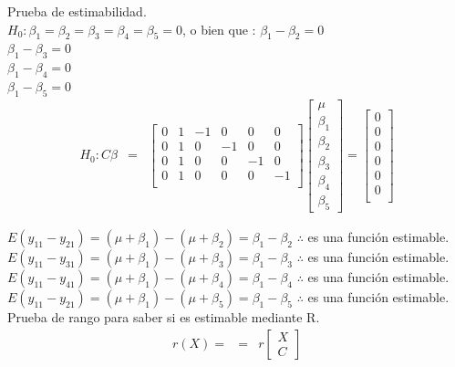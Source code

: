 \documentclass[12pt,a4paper]{report}
\begin{document}
Prueba de estimabilidad.\\
$H_0 : \beta_1 = \beta_2 = \beta_3 = \beta_4 = \beta_5 = 0$, o bien que : $\beta_1 -\beta_2=0$\\
$\beta_1 -\beta_3=0$\\
$\beta_1 -\beta_4=0$\\
$\beta_1 -\beta_5=0$
	\begin{eqnarray*}
		H_0:C\beta&=&\begin{bmatrix}
			0  & 1 &-1 & 0 & 0 & 0\\
			0  & 1 &0 & -1 & 0 & 0\\
			0  & 1 &0 & 0 & -1 & 0\\
			0  & 1 &0 & 0 & 0 & -1\\
		\end{bmatrix}  \begin{bmatrix}
		 \mu \\
		 \beta_1\\
		 \beta_2\\
		 \beta_3\\
		 \beta_4\\
		 \beta_5
		\end{bmatrix} = \begin{bmatrix}
		0 \\
		0\\
		0 \\
		0\\
		0 \\
		0\\
		\end{bmatrix}   	
	\end{eqnarray*}

 $E(y_{11} - y_{21}) = (\mu + \beta_1) - (\mu + \beta_2) = \beta_1-\beta_2$ $\therefore$ es una función estimable.\\
 
$E(y_{11} - y_{31}) = (\mu + \beta_1) - (\mu + \beta_3) = \beta_1-\beta_3$ $\therefore$ es una función estimable.\\

$E(y_{11} - y_{41}) = (\mu + \beta_1) - (\mu + \beta_4) = \beta_1-\beta_4$ $\therefore$ es una función estimable.\\

$E(y_{11} - y_{21}) = (\mu + \beta_1) - (\mu + \beta_5) = \beta_1-\beta_5$ $\therefore$ es una función estimable.\\
		

Prueba de rango para saber si es estimable mediante R.\\	
	\begin{eqnarray*}
		r(X)=&=&r\begin{bmatrix}
			X\\
			C
		\end{bmatrix}   	
	\end{eqnarray*}
	
\end{document}
